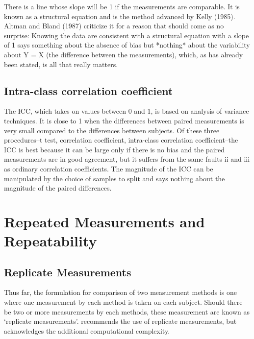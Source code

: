 \documentclass[12pt, a4paper]{report}
\theoremstyle{plain}
\theoremstyle{definition}
\theoremstyle{remark}
\begin{document}
 There is a line whose slope will be 1 if the measurements are comparable. It is known as a structural equation and is the method advanced by Kelly (1985). Altman and Bland (1987) criticize it for a reason that should come as no surprise: Knowing the data are consistent with a structural equation with a slope of 1 says something about the absence of bias but *nothing* about the variability about Y = X (the difference between the measurements), which, as has already been stated, is all that really matters.

	
	
	
	\section*{Intra-class correlation coefficient}
 
	The ICC, which takes on values between 0 and 1, is based on analysis of variance techniques. It is close to 1 when the differences between paired measurements is very small compared to the differences between subjects. Of these three procedures--t test, correlation coefficient, intra-class correlation coefficient--the ICC is best because it can be large only if there is no bias and the paired measurements are in good agreement, but it suffers from the same faults ii and iii as ordinary correlation coefficients. The magnitude of the ICC can be manipulated by the choice of samples to split and says nothing about the magnitude of the paired differences.


	



\chapter{Repeated Measurements and Repeatability}
	
	
	
	\section{Replicate Measurements}
	
	Thus far, the formulation for comparison of two measurement
	methods is one where one measurement by each method is taken on
	each subject. Should there be two or more measurements by each
	methods, these measurement are known as `replicate measurements'.
	\citet{BXC2008} recommends the use of replicate measurements, but
	acknowledges the additional computational complexity.
	
\end{document}
